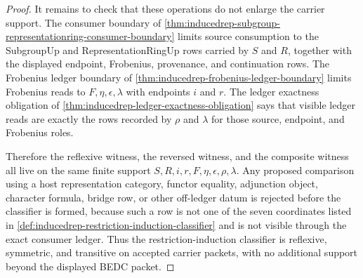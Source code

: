 \begin{proof}
It remains to check that these operations do not enlarge the carrier support.
The consumer boundary of
\autoref{thm:inducedrep-subgroup-representationring-consumer-boundary} limits
source consumption to the SubgroupUp and RepresentationRingUp rows carried by
$S$ and $R$, together with the displayed endpoint, Frobenius, provenance, and
continuation rows. The Frobenius ledger boundary of
\autoref{thm:inducedrep-frobenius-ledger-boundary} limits Frobenius reads to
$F,\eta,\epsilon,\lambda$ with endpoints $i$ and $r$. The ledger exactness
obligation of \autoref{thm:inducedrep-ledger-exactness-obligation} says that
visible ledger reads are exactly the rows recorded by $\rho$ and $\lambda$ for
those source, endpoint, and Frobenius roles.

Therefore the reflexive witness, the reversed witness, and the composite
witness all live on the same finite support
$S,R,i,r,F,\eta,\epsilon,\rho,\lambda$. Any proposed comparison using a host
representation category, functor equality, adjunction object, character
formula, bridge row, or other off-ledger datum is rejected before the
classifier is formed, because such a row is not one of the seven coordinates
listed in \autoref{def:inducedrep-restriction-induction-classifier} and is not
visible through the exact consumer ledger. Thus the restriction-induction
classifier is reflexive, symmetric, and transitive on accepted carrier
packets, with no additional support beyond the displayed BEDC packet.
\end{proof}
